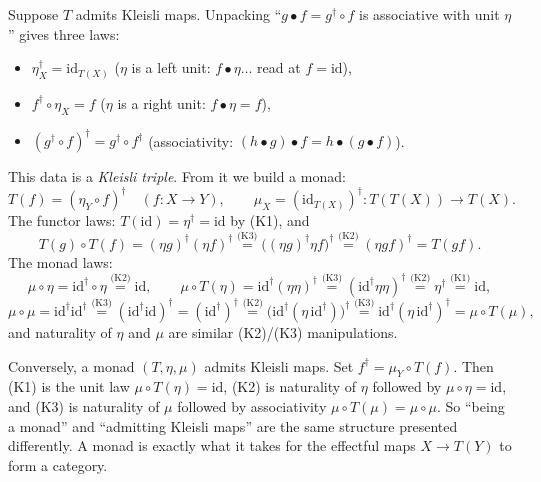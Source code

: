 \documentclass[11pt, a4paper]{article}
\theoremstyle{definition}
\theoremstyle{plain}
\begin{document}
Suppose $T$ admits Kleisli maps.  Unpacking ``$g \bullet f =
g^\dagger \circ f$ is associative with unit $\eta$'' gives three
laws:
\begin{itemize}
  \item[(K1)] $\eta_X^\dagger = \mathrm{id}_{T(X)}$
    \hfill ($\eta$ is a left unit: $f \bullet \eta \dots$ read at
    $f = \mathrm{id}$),
  \item[(K2)] $f^\dagger \circ \eta_X = f$
    \hfill ($\eta$ is a right unit: $f \bullet \eta = f$),
  \item[(K3)] $(g^\dagger \circ f)^\dagger = g^\dagger \circ
    f^\dagger$
    \hfill (associativity: $(h \bullet g) \bullet f = h \bullet (g
    \bullet f)$).
\end{itemize}
This data is a \emph{Kleisli triple}.  From it we build a monad:
\[
  T(f) = (\eta_Y \circ f)^\dagger \quad (f : X \to Y),
  \qquad
  \mu_X = (\mathrm{id}_{T(X)})^\dagger : T(T(X)) \to T(X).
\]
The functor laws:
$T(\mathrm{id}) = \eta^\dagger = \mathrm{id}$ by (K1), and
\[
  T(g) \circ T(f)
  = (\eta g)^\dagger (\eta f)^\dagger
  \overset{\text{(K3)}}{=} \bigl((\eta g)^\dagger \eta f\bigr)^\dagger
  \overset{\text{(K2)}}{=} (\eta g f)^\dagger
  = T(g f).
\]
The monad laws:
\[
  \mu \circ \eta = \mathrm{id}^\dagger \circ \eta
    \overset{\text{(K2)}}{=} \mathrm{id},
  \qquad
  \mu \circ T(\eta) = \mathrm{id}^\dagger (\eta\eta)^\dagger
    \overset{\text{(K3)}}{=} (\mathrm{id}^\dagger \eta \eta)^\dagger
    \overset{\text{(K2)}}{=} \eta^\dagger
    \overset{\text{(K1)}}{=} \mathrm{id},
\]
\[
  \mu \circ \mu
  = \mathrm{id}^\dagger \mathrm{id}^\dagger
  \overset{\text{(K3)}}{=} (\mathrm{id}^\dagger \mathrm{id})^\dagger
  = (\mathrm{id}^\dagger)^\dagger
  \overset{\text{(K2)}}{=} \bigl(\mathrm{id}^\dagger (\eta\,
    \mathrm{id}^\dagger)\bigr)^\dagger
  \overset{\text{(K3)}}{=} \mathrm{id}^\dagger (\eta\,
    \mathrm{id}^\dagger)^\dagger
  = \mu \circ T(\mu),
\]
and naturality of $\eta$ and $\mu$ are similar (K2)/(K3)
manipulations.

Conversely, a monad $(T, \eta, \mu)$ admits Kleisli maps.  Set
$f^\dagger = \mu_Y \circ T(f)$.  Then (K1) is the unit law
$\mu \circ T(\eta) = \mathrm{id}$, (K2) is naturality of $\eta$
followed by $\mu \circ \eta = \mathrm{id}$, and (K3) is naturality
of $\mu$ followed by associativity $\mu \circ T(\mu) = \mu \circ
\mu$.  So ``being a monad'' and ``admitting Kleisli maps'' are the
same structure presented differently.  A monad is exactly what it
takes for the effectful maps $X \to T(Y)$ to form a category.
\end{document}
